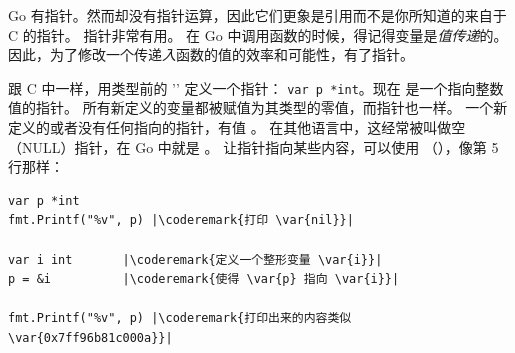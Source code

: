 \noindent{}
Go 有指针。然而却没有指针运算，因此它们更象是引用而不是你所知道的来自于 C 的指针。
指针非常有用。
在 Go 中调用函数的时候，得记得变量是\emph{值传递}的。
因此，为了修改一个传递\emph{入}函数的值的效率和可能性，有了指针。

跟 C 中一样，用类型前的 '\key{*}' 定义一个指针：
\lstinline{var p *int}。现在  是一个指向整数值的指针。
所有新定义的变量都被赋值为其类型的零值，而指针也一样。
一个新定义的或者没有任何指向的指针，有值 。
在其他语言中，这经常被叫做空（NULL）指针，在 Go 中就是 。
让指针指向某些内容，可以使用
（\func{\&}），像第 5 行那样：
\begin{lstlisting}[caption=Use of a pointer,label=src:pointers]
var p *int
fmt.Printf("%v", p) |\coderemark{打印 \var{nil}}|

var i int	    |\coderemark{定义一个整形变量 \var{i}}|
p = &i		    |\coderemark{使得 \var{p} 指向 \var{i}}|

fmt.Printf("%v", p) |\coderemark{打印出来的内容类似 \var{0x7ff96b81c000a}}|
\end{lstlisting}

